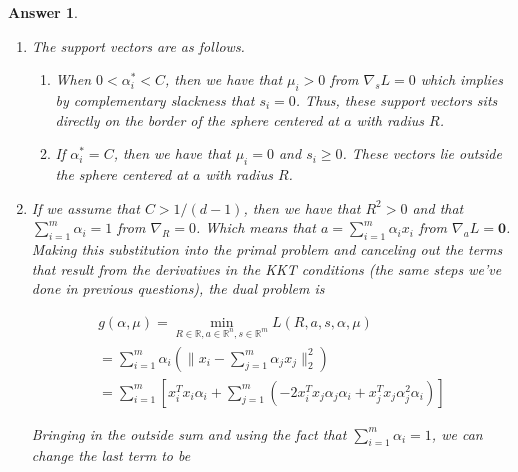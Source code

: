 \documentclass[12pt]{article}
\theoremstyle{colon}
\newtheorem*{answer}{Answer}
\begin{document}
\begin{answer}
\begin{enumerate}[label=\alph*)]
      \begin{gather*}
        \sum_{i=1}^{d-1} \alpha_i \leq 1
      \end{gather*}

      Combining this with $\alpha \leq C \bm{1}$ yields

      \begin{gather*}
        (d-1) C \leq 1 \implies C \leq 1/(d-1)
      \end{gather*}

      Thus, we have shown that ${R^2}^* = 0 \implies C \leq 1/(d-1)$ whose contrapositive is $C > 1/(d-1) \implies {R^2}^* > 0$.

    \item The support vectors are as follows.
      \begin{enumerate}[label=\arabic*)]
        \item When $0 < \alpha_i^* < C$, then we have that $\mu_i > 0$ from $\nabla_s L = 0$ which implies by complementary slackness that $s_i = 0$. Thus, these support vectors sits directly on the border of the sphere centered at $a$ with radius $R$.
        \item If $\alpha_i^* = C$, then we have that $\mu_i = 0$ and $s_i \geq 0$. These vectors lie outside the sphere centered at $a$ with radius $R$.
      \end{enumerate}

    \item If we assume that $C > 1/(d-1)$, then we have that $R^2 > 0$ and that $\sum_{i=1}^m \alpha_i = 1$ from $\nabla_R = 0$. Which means that $a = \sum_{i=1}^m \alpha_i x_i$ from $\nabla_a L = \bm{0}$. Making this substitution into the primal problem and canceling out the terms that result from the derivatives in the KKT conditions (the same steps we've done in previous questions), the dual problem is

      \begin{gather*}
        g(\alpha, \mu) = \min_{R \in \mathbb{R}, a \in \mathbb{R}^n, s \in \mathbb{R}^m} L(R, a, s, \alpha, \mu) \\
        = \sum_{i=1}^m \alpha_i (\lVert x_i - \sum_{j=1}^m \alpha_j x_j \rVert_2^2) \\
        = \sum_{i=1}^m \left[ x_i^T x_i \alpha_i + \sum_{j=1}^m \left( -2x_i^T x_j \alpha_j \alpha_i + x_j^T x_j \alpha_j^2 \alpha_i \right) \right]
      \end{gather*}

      Bringing in the outside sum and using the fact that $\sum_{i=1}^m \alpha_i = 1$, we can change the last term to be


\end{enumerate}
\end{answer}
\end{document}
